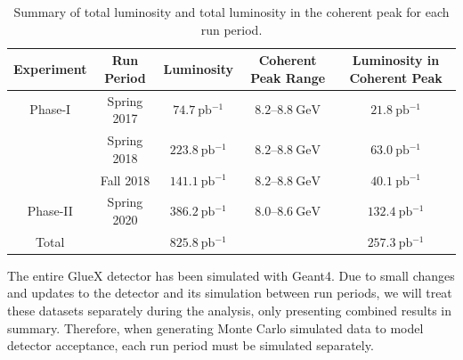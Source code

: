 \begin{table}
  \begin{center}
    \begin{tabular}{ccccc}\toprule
      Experiment & Run Period & Luminosity & Coherent Peak Range & Luminosity in Coherent Peak \\\midrule
      Phase-I & Spring 2017 & $\SI{74.7}{\pico\barn^{-1}}$ & $8.2$--$\SI{8.8}{\giga\eV}$ & $\SI{21.8}{\pico\barn^{-1}}$ \\
              & Spring 2018 & $\SI{223.8}{\pico\barn^{-1}}$ & $8.2$--$\SI{8.8}{\giga\eV}$ & $\SI{63.0}{\pico\barn^{-1}}$ \\
              & Fall 2018 & $\SI{141.1}{\pico\barn^{-1}}$ & $8.2$--$\SI{8.8}{\giga\eV}$ & $\SI{40.1}{\pico\barn^{-1}}$ \\\midrule
      Phase-II & Spring 2020 & $\SI{386.2}{\pico\barn^{-1}}$ & $8.0$--$\SI{8.6}{\giga\eV}$ & $\SI{132.4}{\pico\barn^{-1}}$ \\\midrule
      Total & & $\SI{825.8}{\pico\barn^{-1}}$ & & $\SI{257.3}{\pico\barn^{-1}}$ \\\bottomrule
    \end{tabular}
    \caption{Summary of total luminosity and total luminosity in the coherent peak for each run period.}\label{tab:run-info}
  \end{center}
\end{table}

The entire GlueX detector has been simulated with Geant4. Due to small changes and updates to the detector and its simulation between run periods, we will treat these datasets separately during the analysis, only presenting combined results in summary. Therefore, when generating Monte Carlo simulated data to model detector acceptance, each run period must be simulated separately.
